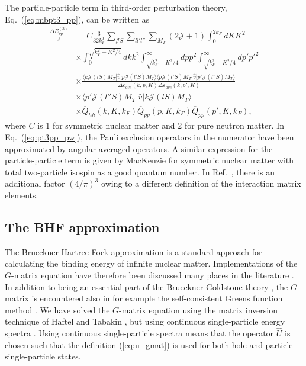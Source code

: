 \documentclass[a4paper,12pt]{report}
\begin{document}
The particle-particle term in third-order perturbation theory, Eq.~(\ref{eq:mbpt3_pp}), can be written as 
\begin{align}
  \frac{\Delta E_{pp}^{(3)}}{A} &= C \frac{3}{32k_{F}^{3}}\sum_{\mathcal{J}S}\sum_{ll'l''}\sum_{M_{T}}(2\mathcal{J} + 1) \int_{0}^{2k_{F}}dK K^{2} \nonumber \\
  & \times \int_{0}^{\sqrt{k_{F}^{2}-K^{2}/4}}dk k^{2}\int_{\sqrt{k_{F}^{2}-K^{2}/4}}^{\infty }dp p^{2} \int_{\sqrt{k_{F}^{2}-K^{2}/4}}^{\infty }dp' p'^{2} \nonumber \\
  & \times \frac{\langle k\mathcal{J}(lS)M_{T}|\hat{v}|p\mathcal{J}(l'S)M_{T}\rangle \langle p\mathcal{J}(l'S)M_{T}|\hat{v}|p'\mathcal{J}(l''S)M_{T}\rangle }{\Delta \varepsilon_{ave}(k, p, K) \Delta \varepsilon_{ave}(k, p', K)} \nonumber \\
  & \times \langle p'\mathcal{J}(l''S)M_{T}|\hat{v}|k\mathcal{J}(lS)M_{T}\rangle \nonumber \\
  & \times \overline{Q}_{hh}(k, K, k_{F})\overline{Q}_{pp}(p, K, k_{F})\overline{Q}_{pp}(p', K, k_{F}), 
  \label{eq:pt3pp_pw}
\end{align}
where $C$ is 1 for symmetric nuclear matter and 2 for pure neutron matter. In Eq.~(\ref{eq:pt3pp_pw}), the Pauli exclusion operators in the numerator have been approximated by angular-averaged operators. A similar expression for the particle-particle term is given by MacKenzie \cite{mackenzie} for symmetric nuclear matter with total two-particle isospin as a good quantum number. In Ref.~\cite{mackenzie}, there is an additional factor $(4/\pi )^{3}$ owing to a different definition of the interaction matrix elements. 


\subsection{The BHF approximation}
The Brueckner-Hartree-Fock approximation is a standard approach for calculating the binding energy of infinite nuclear matter. Implementations of the $G$-matrix equation have therefore been discussed many places in the literature \cite{haftel_tabakin, ramos_phd, mahaux1985, hjensen1995}. In addition to being an essential part of the Brueckner-Goldstone theory \cite{day1967}, the $G$ matrix is encountered also in for example the self-consistent Greens function method \cite{ramos_polls}. We have solved the $G$-matrix equation using the matrix inversion technique of Haftel and Tabakin \cite{haftel_tabakin}, but using continuous single-particle energy spectra \cite{mahaux1985, mahaux1989}. Using continuous single-particle spectra means that the operator $\hat{U}$ is chosen such that the definition (\ref{eq:u_gmat}) is used for both hole and particle single-particle states.
\end{document}
